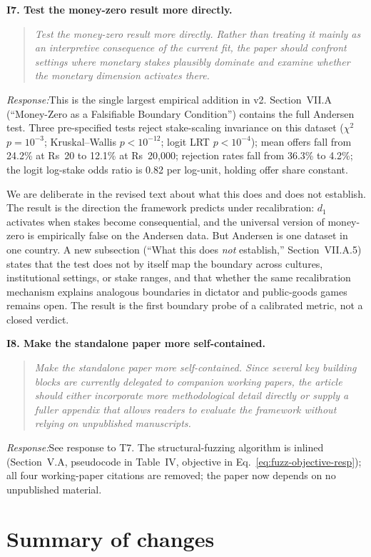 \documentclass[11pt]{article}
\newcommand{\rev}[1]{\textbf{#1}}
\newcommand{\resp}{\medskip\noindent\emph{Response:}\quad}
\begin{document}
\rev{I7. Test the money-zero result more directly.}
\begin{quote}\itshape\small
Test the money-zero result more directly. Rather than treating it mainly as an interpretive consequence of the current fit, the paper should confront settings where monetary stakes plausibly dominate and examine whether the monetary dimension activates there.
\end{quote}
\resp This is the single largest empirical addition in v2. Section~VII.A
(``Money-Zero as a Falsifiable Boundary Condition'') contains the full Andersen test.
Three pre-specified tests reject stake-scaling invariance on this dataset
($\chi^2$ $p=10^{-3}$; Kruskal--Wallis $p<10^{-12}$; logit LRT $p<10^{-4}$);
mean offers fall from 24.2\% at Rs~20 to 12.1\% at Rs~20{,}000; rejection rates fall
from 36.3\% to 4.2\%; the logit log-stake odds ratio is 0.82 per log-unit, holding
offer share constant.

We are deliberate in the revised text about what this does and does not establish.
The result is the direction the framework predicts under recalibration: $d_1$
activates when stakes become consequential, and the universal version of money-zero
is empirically false on the Andersen data. But Andersen is one dataset in one country.
A new subsection (``What this does \emph{not} establish,'' Section~VII.A.5) states
that the test does not by itself map the boundary across cultures, institutional
settings, or stake ranges, and that whether the same recalibration mechanism explains
analogous boundaries in dictator and public-goods games remains open. The result is
the first boundary probe of a calibrated metric, not a closed verdict.

\rev{I8. Make the standalone paper more self-contained.}
\begin{quote}\itshape\small
Make the standalone paper more self-contained. Since several key building blocks are currently delegated to companion working papers, the article should either incorporate more methodological detail directly or supply a fuller appendix that allows readers to evaluate the framework without relying on unpublished manuscripts.
\end{quote}
\resp See response to T7. The structural-fuzzing algorithm is inlined (Section~V.A,
pseudocode in Table~IV, objective in Eq.~\ref{eq:fuzz-objective-resp}); all four
working-paper citations are removed; the paper now depends on no unpublished material.

\section*{Summary of changes}
\end{document}
